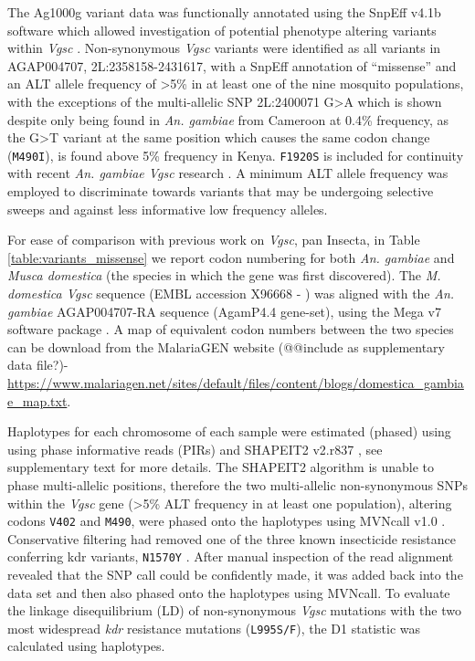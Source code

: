 \documentclass[a4paper,11pt,abstracton,hidelinks]{scrartcl}
\begin{document}
%
The Ag1000g variant data was functionally annotated using the SnpEff v4.1b software which allowed investigation of potential phenotype altering variants within \emph{Vgsc} \cite{Cingolani2012}.
%
Non-synonymous \emph{Vgsc} variants were identified as all variants in AGAP004707, 2L:2358158-2431617, with a SnpEff annotation of “missense”  and an ALT allele frequency of >5\% in at least one of the nine mosquito populations, with the exceptions of the multi-allelic SNP 2L:2400071 G>A which is shown despite only being found in \emph{An. gambiae} from Cameroon at 0.4\% frequency, as the G>T variant at the same position which causes the same codon change (\texttt{M490I}), is found above 5\% frequency in Kenya.
%
\texttt{F1920S} is included for continuity with recent \emph{An. gambiae Vgsc} research \cite{RecombinationAg1000gConsortium2017}.
%
A minimum ALT allele frequency was employed to discriminate towards variants that may be undergoing selective sweeps and against less informative low frequency alleles.

%
For ease of comparison with previous work on \emph{Vgsc}, pan Insecta, in Table \ref{table:variants_missense} we report codon numbering for both \emph{An. gambiae} and \emph{Musca domestica} (the species in which the gene was first discovered).
%
The \emph{M. domestica Vgsc} sequence (EMBL accession X96668 - \cite{Williamson1996}) was aligned with the \emph{An. gambiae} AGAP004707-RA sequence (AgamP4.4 gene-set), using the Mega v7 software package \cite{Kumar2016}.
%
A map of equivalent codon numbers between the two species can be download from the MalariaGEN website (@@include as supplementary data file?)- 
\url{https://www.malariagen.net/sites/default/files/content/blogs/domestica_gambiae_map.txt}.

%
Haplotypes for each chromosome of each sample were estimated (phased) using using phase informative reads (PIRs) and SHAPEIT2 v2.r837 \cite{Delaneau2013}, see \cite{Ag1000gConsortium2017} supplementary text for more details.
%
The SHAPEIT2 algorithm is unable to phase multi-allelic positions, therefore the two multi-allelic non-synonymous SNPs within the \emph{Vgsc} gene (>5\% ALT frequency in at least one population), altering codons \texttt{V402} and \texttt{M490}, were phased onto the haplotypes using MVNcall v1.0 \cite{Menelaou2013}.
%
Conservative filtering had removed one of the three known insecticide resistance conferring kdr variants, \texttt{N1570Y} \cite{Jones2012}.
%
After manual inspection of the read alignment revealed that the SNP call could be confidently made, it was added back into the data set and then also phased onto the haplotypes using MVNcall.
%
To evaluate the linkage disequilibrium (LD) of non-synonymous \emph{Vgsc} mutations with the two most widespread \emph{kdr} resistance mutations (\texttt{L995S/F}), the D1 statistic was calculated using haplotypes.
\end{document}
